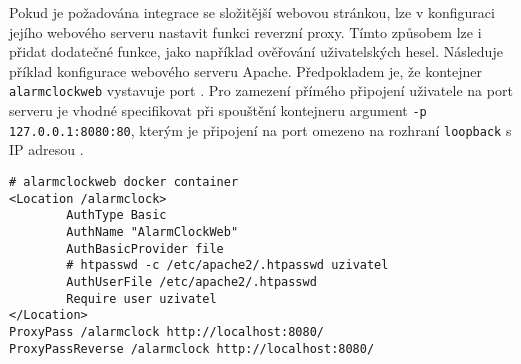 Pokud je požadována integrace se složitější webovou stránkou, lze v konfiguraci
jejího webového serveru nastavit funkci reverzní proxy. Tímto způsobem lze
i přidat dodatečné funkce, jako například ověřování uživatelských hesel.
Následuje příklad konfigurace webového serveru Apache.
Předpokladem je, že kontejner \texttt{alarmclockweb} vystavuje port
. Pro zamezení přímého připojení uživatele na port 
serveru je vhodné specifikovat při spouštění kontejneru argument
\texttt{-p 127.0.0.1:8080:80}, kterým je připojení na port  omezeno
na rozhraní \texttt{loopback} s IP adresou .
\begin{lstlisting}[language=hashcomment,style=numbers]
# alarmclockweb docker container
<Location /alarmclock>
        AuthType Basic
        AuthName "AlarmClockWeb"
        AuthBasicProvider file
        # htpasswd -c /etc/apache2/.htpasswd uzivatel
        AuthUserFile /etc/apache2/.htpasswd
        Require user uzivatel
</Location>
ProxyPass /alarmclock http://localhost:8080/
ProxyPassReverse /alarmclock http://localhost:8080/
\end{lstlisting}
